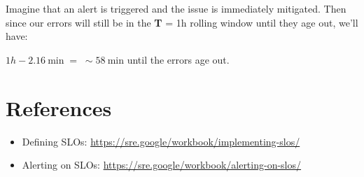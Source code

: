 \documentclass{article}
\begin{document}
\noindent Imagine that an alert is triggered and the issue is immediately mitigated. Then since our errors will still be in the \textbf{T} = 1h rolling window until they age out, we'll have:

\quad

$1h - 2.16\ \text{min} \;=\; \sim58\ \text{min}$ until the errors age out.

\section*{References}

\begin{itemize}
    \item Defining SLOs: \href{Defining SLOs}{https://sre.google/workbook/implementing-slos/}
    \item Alerting on SLOs: \href{Alerting on SLOs}{https://sre.google/workbook/alerting-on-slos/}
\end{itemize}
\end{document}
